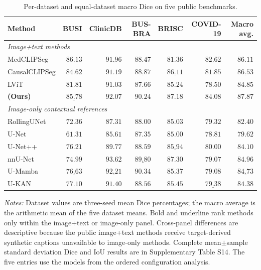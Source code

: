 \ifnum{}
\begin{table}[htbp]
\centering
\caption{Per-dataset and equal-dataset macro Dice on five public benchmarks.}
\label{tab:bspc_v3_models}
\scriptsize
\setlength{\tabcolsep}{2.0pt}
\begin{tabular}{@{}lrrrrrr@{}}
\toprule
Method & BUSI & ClinicDB & BUS-BRA & BRISC & COVID-19 & Macro avg. \\
\midrule
\multicolumn{7}{l}{\textit{Image+text methods}} \\
MedCLIPSeg
 & $\mathbf{86.13}$ & $\underline{91.96}$ & $88.47$
 & $81.36$ & $\underline{82.62}$ & $86.11$ \\
CausalCLIPSeg
 & $84.62$ & $91.19$ & $\underline{88.87}$
 & $\underline{86.11}$ & $81.85$ & $\underline{86.53}$ \\
LViT
 & $81.81$ & $91.03$ & $87.66$
 & $85.24$ & $78.50$ & $84.85$ \\
\textbf{\methodname{} (Ours)}
 & $\underline{85.78}$ & $\mathbf{92.07}$ & $\mathbf{90.24}$
 & $\mathbf{87.18}$ & $\mathbf{84.08}$ & $\mathbf{87.87}$ \\
\midrule
\multicolumn{7}{l}{\textit{Image-only contextual references}} \\
RollingUNet
 & $72.36$ & $87.31$ & $88.00$
 & $85.03$ & $79.32$ & $82.40$ \\
U-Net
 & $61.31$ & $85.61$ & $87.35$
 & $85.00$ & $78.81$ & $79.62$ \\
U-Net++
 & $76.21$ & $89.77$ & $88.59$
 & $\underline{85.94}$ & $\mathbf{80.00}$ & $84.10$ \\
nnU-Net
 & $74.99$ & $\mathbf{93.62}$ & $\underline{89.80}$
 & $\mathbf{87.30}$ & $79.07$ & $\mathbf{84.96}$ \\
U-Mamba
 & $\underline{76.63}$ & $\underline{92.21}$ & $\mathbf{90.34}$
 & $85.37$ & $79.08$ & $\underline{84.73}$ \\
U-KAN
 & $\mathbf{77.10}$ & $91.40$ & $88.56$
 & $85.45$ & $\underline{79.38}$ & $84.38$ \\
\bottomrule
\end{tabular}
\vspace{2pt}
\begin{minipage}{0.98\linewidth}
\footnotesize\raggedright
\textit{Notes:} Dataset values are three-seed mean Dice percentages; the macro
average is the arithmetic mean of the five dataset means. Bold and underline rank
methods only within the image+text
or image-only panel. Cross-panel differences are descriptive because the
public image+text methods receive target-derived synthetic captions unavailable
to image-only methods. Complete mean$\pm$sample standard deviation Dice and IoU
results are in Supplementary Table S14. The five \methodname{} entries use the
models from the ordered configuration analysis.\par
\end{minipage}
\end{table}
\fi

